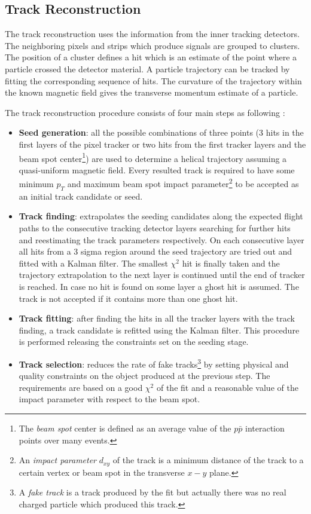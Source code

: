 \subsection{Track Reconstruction}\label{ssec:trkReco}

The track reconstruction uses the information from the inner tracking detectors. The neighboring pixels and strips which
produce signals are grouped to clusters. The position of a cluster defines a hit which is an estimate of the point where a particle crossed the
detector material. A particle trajectory can be tracked by fitting the corresponding sequence of hits. The curvature 
of the trajectory within the known magnetic field gives the transverse momentum estimate of a particle.

The track reconstruction procedure consists of four main steps as following \cite{Chatrchyan:2014fea}:

\begin{itemize}
 \item \textbf{Seed generation}: all the possible combinations of three points (3 hits in the first layers of the pixel tracker or
 two hits from the first tracker layers and the beam spot center\footnote{The \textit{beam spot} center is 
 defined as an average value of the $p\bar{p}$ interaction points over many events.}) are used to determine a helical trajectory 
 assuming a quasi-uniform magnetic field. Every resulted track is required to have some minimum $p_{T}$ and maximum beam spot impact 
 parameter\footnote{An \textit{impact parameter} $d_{xy}$ of the track is a minimum distance of the track to a certain vertex or 
 beam spot in the transverse $x-y$ plane.} to be accepted as an initial track candidate or seed.
 \item \textbf{Track finding}: extrapolates the seeding candidates along the expected flight paths to the consecutive tracking detector layers searching 
 for further hits and reestimating the track parameters respectively. On each consecutive layer all hits from a 3 sigma region around the seed trajectory
 are tried out and fitted with a Kalman filter\cite{Fruhwirth:1987fm}. The smallest $\chi^{2}$ hit is finally taken and the trajectory
 extrapolation to the next layer is continued until the end of tracker is reached. In case no hit is found on some layer a ghost hit is assumed. The track is not
 accepted if it contains more than one ghost hit.
 \item \textbf{Track fitting}: after finding the hits in all the tracker layers with the track finding, a track candidate is refitted using the Kalman filter. 
 This procedure is performed releasing the constraints set on the seeding stage.
 \item \textbf{Track selection}: reduces the rate of fake tracks\footnote{A \textit{fake track} is a track produced by the fit but actually there was
 no real charged particle which produced this track.} by setting physical and quality constraints on the object produced at the previous step. The requirements
 are based on a good $\chi^{2}$ of the fit and a reasonable value of the impact parameter with respect to the beam spot.
\end{itemize}

